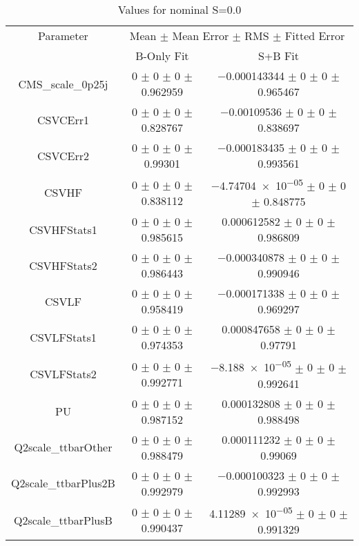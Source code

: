 \begin{table}
\centering
\caption{Values for nominal S=0.0}
\begin{tabular}{ccc}
\toprule
Parameter & \multicolumn{2}{c}{Mean $\pm$ Mean Error $\pm$ RMS $\pm$ Fitted Error}\\
 & B-Only Fit & S+B Fit\\
\midrule
CMS\_scale\_0p25j & \num{0} $\pm$ \num{0} $\pm$ \num{0} $\pm$ \num{0.962959} & \num{-0.000143344} $\pm$ \num{0} $\pm$ \num{0} $\pm$ \num{0.965467}\\
CSVCErr1 & \num{0} $\pm$ \num{0} $\pm$ \num{0} $\pm$ \num{0.828767} & \num{-0.00109536} $\pm$ \num{0} $\pm$ \num{0} $\pm$ \num{0.838697}\\
CSVCErr2 & \num{0} $\pm$ \num{0} $\pm$ \num{0} $\pm$ \num{0.99301} & \num{-0.000183435} $\pm$ \num{0} $\pm$ \num{0} $\pm$ \num{0.993561}\\
CSVHF & \num{0} $\pm$ \num{0} $\pm$ \num{0} $\pm$ \num{0.838112} & \num{-4.74704e-05} $\pm$ \num{0} $\pm$ \num{0} $\pm$ \num{0.848775}\\
CSVHFStats1 & \num{0} $\pm$ \num{0} $\pm$ \num{0} $\pm$ \num{0.985615} & \num{0.000612582} $\pm$ \num{0} $\pm$ \num{0} $\pm$ \num{0.986809}\\
CSVHFStats2 & \num{0} $\pm$ \num{0} $\pm$ \num{0} $\pm$ \num{0.986443} & \num{-0.000340878} $\pm$ \num{0} $\pm$ \num{0} $\pm$ \num{0.990946}\\
CSVLF & \num{0} $\pm$ \num{0} $\pm$ \num{0} $\pm$ \num{0.958419} & \num{-0.000171338} $\pm$ \num{0} $\pm$ \num{0} $\pm$ \num{0.969297}\\
CSVLFStats1 & \num{0} $\pm$ \num{0} $\pm$ \num{0} $\pm$ \num{0.974353} & \num{0.000847658} $\pm$ \num{0} $\pm$ \num{0} $\pm$ \num{0.97791}\\
CSVLFStats2 & \num{0} $\pm$ \num{0} $\pm$ \num{0} $\pm$ \num{0.992771} & \num{-8.188e-05} $\pm$ \num{0} $\pm$ \num{0} $\pm$ \num{0.992641}\\
PU & \num{0} $\pm$ \num{0} $\pm$ \num{0} $\pm$ \num{0.987152} & \num{0.000132808} $\pm$ \num{0} $\pm$ \num{0} $\pm$ \num{0.988498}\\
Q2scale\_ttbarOther & \num{0} $\pm$ \num{0} $\pm$ \num{0} $\pm$ \num{0.988479} & \num{0.000111232} $\pm$ \num{0} $\pm$ \num{0} $\pm$ \num{0.99069}\\
Q2scale\_ttbarPlus2B & \num{0} $\pm$ \num{0} $\pm$ \num{0} $\pm$ \num{0.992979} & \num{-0.000100323} $\pm$ \num{0} $\pm$ \num{0} $\pm$ \num{0.992993}\\
Q2scale\_ttbarPlusB & \num{0} $\pm$ \num{0} $\pm$ \num{0} $\pm$ \num{0.990437} & \num{4.11289e-05} $\pm$ \num{0} $\pm$ \num{0} $\pm$ \num{0.991329}\\

\end{tabular}
\end{table}
